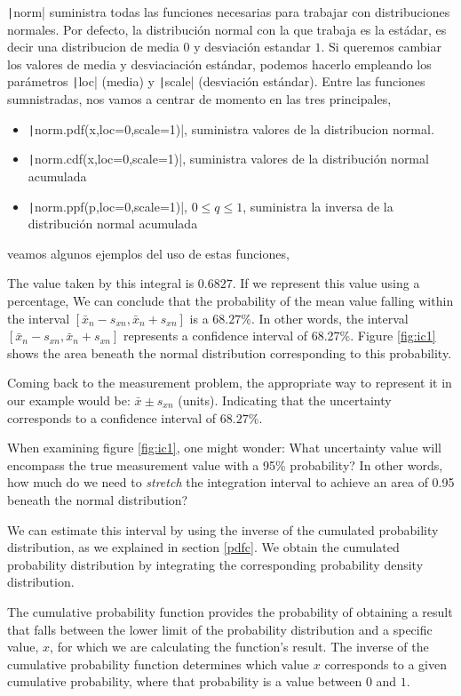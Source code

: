 \begin{paracol}{2}
\texttt|norm| suministra todas las funciones necesarias para trabajar con distribuciones normales. Por defecto, la distribución normal con la que trabaja es la estádar, es decir una distribucion de media $0$ y desviación estandar $1$. Si queremos cambiar los valores de media y desviaciación estándar, podemos hacerlo empleando los parámetros \texttt|loc| (media) y \texttt|scale| (desviación estándar). Entre las funciones sumnistradas, nos vamos a centrar de momento en las tres principales, 
\begin{itemize}
	\item \texttt|norm.pdf(x,loc=0,scale=1)|, suministra valores de la distribucion normal.
	\item \texttt|norm.cdf(x,loc=0,scale=1)|, suministra valores de la distribución normal acumulada
	\item \texttt|norm.ppf(p,loc=0,scale=1)|, $0\leq q \leq 1$, suministra la inversa de la distribución normal acumulada
\end{itemize}
veamos algunos ejemplos del uso de estas funciones,

\switchcolumn
The value taken by this integral is $0.6827$. If we represent this value using a percentage, We can conclude that the probability of the mean value falling within the interval $[\bar{x}_n-s_{xn}, \bar{x}_n+s_{xn}]$ is a $68.27\%$. In other words, the interval $[\bar{x}_n-s_{xn}, \bar{x}_n+s_{xn}]$ represents a confidence interval  of 68.27\%. Figure \ref{fig:ic1} shows the area beneath the normal distribution corresponding to this probability.

Coming back to the measurement problem, the appropriate way to represent it in our example would be: $\bar{x}\pm s_{xn}$ (units). Indicating that the uncertainty corresponds to a confidence interval of $68.27\%$.

When examining figure \ref{fig:ic1}, one might wonder: What uncertainty value will encompass the true measurement value with a 95\% probability? In other words, how much do we need to \emph{stretch} the integration interval to achieve an area of 0.95 beneath the normal distribution?

We can estimate this interval by using the inverse of the cumulated probability distribution, as we explained in section \ref{pdfc}. We obtain the cumulated probability distribution by integrating the corresponding probability density distribution.     

The cumulative probability function provides the probability of obtaining a result that falls between the lower limit of the probability distribution and a specific value, $x$, for which we are calculating the function's result. The inverse of the cumulative probability function determines which value $x$ corresponds to a given cumulative probability, where that probability is a value between $0$ and $1$.


\end{paracol}
